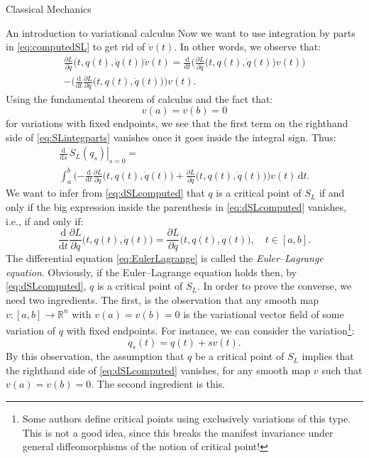 \documentclass[oneside,a4paper,11pt]{amsbook}
\newcommand{\R}{\mathds R}
\newcommand{\dd}{\mathrm d}
\theoremstyle{remark}\newtheorem{exercise}{Exercise}[chapter]
\theoremstyle{plain}\newtheorem{teo}{Theorem}[section]
\theoremstyle{plain}\newtheorem{lem}[teo]{Lemma}
\theoremstyle{plain}\newtheorem{prop}[teo]{Proposition}
\theoremstyle{plain}\newtheorem{cor}[teo]{Corollary}
\theoremstyle{definition}\newtheorem{defin}[teo]{Definition}
\theoremstyle{remark}\newtheorem{rem}[teo]{Remark}
\theoremstyle{definition}\newtheorem{notation}[teo]{Notation}
\theoremstyle{definition}\newtheorem{convention}[teo]{Convention}
\theoremstyle{definition}\newtheorem{example}[teo]{Example}
\numberwithin{section}{chapter}
\numberwithin{equation}{section}
\begin{document}
\begin{chapter}{Classical Mechanics}
\begin{section}{An introduction to variational calculus}
Now we want to use integration by parts in \eqref{eq:computedSL} to get rid of $\dot v(t)$. In other words, we observe
that:
\begin{multline}\label{eq:SLintegparts}
\frac{\partial L}{\partial\dot q}\big(t,q(t),\dot q(t)\big)\dot v(t)=
\frac{\dd}{\dd t}\Big(\frac{\partial L}{\partial\dot q}\big(t,q(t),\dot q(t)\big)v(t)\Big)\\
-\Big(\frac{\dd}{\dd t}\frac{\partial L}{\partial\dot q}\big(t,q(t),\dot q(t)\big)\Big)v(t).
\end{multline}
Using the fundamental theorem of calculus and the fact that:
\[v(a)=v(b)=0\]
for variations with fixed endpoints, we see
that the first term on the righthand side of \eqref{eq:SLintegparts} vanishes once it goes inside the integral sign.
Thus:
\begin{multline}\label{eq:dSLcomputed}
\left.\frac{\dd}{\dd s}\,S_L(q_s)\right\vert_{s=0}=\\
\int_a^b\Big({-\frac{\dd}{\dd t}\frac{\partial L}{\partial\dot q}
\big(t,q(t),\dot q(t)\big)}+\frac{\partial L}{\partial q}\big(t,q(t),\dot q(t)\big)\Big)v(t)\,\dd t.
\end{multline}
We want to infer from \eqref{eq:dSLcomputed} that $q$ is a critical point of $S_L$ if and only if the big expression
inside the parenthesis in \eqref{eq:dSLcomputed} vanishes, i.e., if and only if:
\begin{equation}\label{eq:EulerLagrange}
\frac{\dd}{\dd t}\frac{\partial L}{\partial\dot q}\big(t,q(t),\dot q(t)\big)=
\frac{\partial L}{\partial q}\big(t,q(t),\dot q(t)\big),\quad t\in[a,b].
\end{equation}
The differential equation \eqref{eq:EulerLagrange} is called the {\em Euler--Lagrange equation}. Obviously,
if the Euler--Lagrange equation holds then, by \eqref{eq:dSLcomputed}, $q$ is a critical point of $S_L$. In order
to prove the converse, we need two ingredients. The first, is the observation that any smooth map $v:[a,b]\to\R^n$
with $v(a)=v(b)=0$ is the variational vector field of some variation of $q$ with fixed endpoints. For instance,
we can consider the variation\footnote{%
Some authors define critical points using exclusively variations of this type. This is not a good idea, since this
breaks the manifest invariance under general diffeomorphisms of the notion of critical point!}:
\[q_s(t)=q(t)+sv(t).\]
By this observation, the assumption that $q$ be a critical point of $S_L$ implies that the righthand side of
\eqref{eq:dSLcomputed} vanishes, for any smooth map $v$ such that $v(a)=v(b)=0$. The second ingredient
is this.


\end{section}
\end{chapter}
\end{document}
